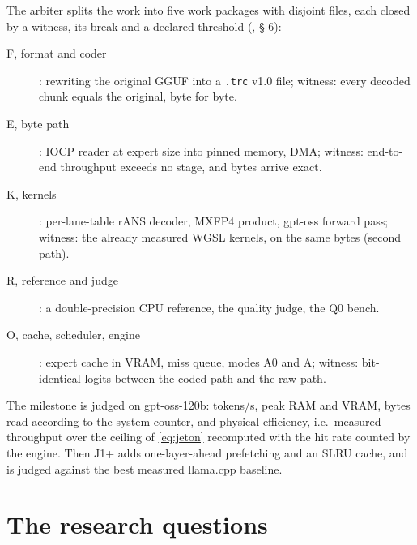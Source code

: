 The arbiter splits the work into five work packages with disjoint files, each closed by a witness, its break and a declared threshold (, § 6):
\begin{description}
\item[F, format and coder]: rewriting the original GGUF into a \texttt{.trc} v1.0 file; witness: every decoded chunk equals the original, byte for byte.
\item[E, byte path]: IOCP reader at expert size into pinned memory, DMA; witness: end-to-end throughput exceeds no stage, and bytes arrive exact.
\item[K, kernels]: per-lane-table rANS decoder, MXFP4 product, gpt-oss forward pass; witness: the already measured WGSL kernels, on the same bytes (second path).
\item[R, reference and judge]: a double-precision CPU reference, the quality judge, the Q0 bench.
\item[O, cache, scheduler, engine]: expert cache in VRAM, miss queue, modes A0 and A; witness: bit-identical logits between the coded path and the raw path.
\end{description}
The milestone is judged on gpt-oss-120b: tokens/s, peak RAM and VRAM, bytes read according to the system counter, and physical efficiency, i.e.\ measured throughput over the ceiling of \cref{eq:jeton} recomputed with the hit rate counted by the engine. Then J1+ adds one-layer-ahead prefetching and an SLRU cache, and is judged against the best measured llama.cpp baseline.

\section{The research questions}\label{sec:questions-recherche}

